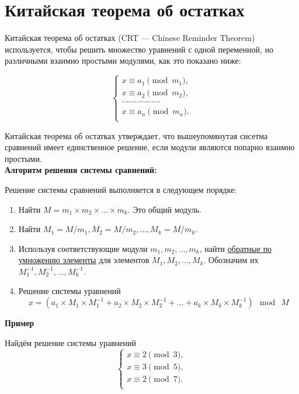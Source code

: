 \documentclass[12pt,a4paper]{scrartcl}
\begin{document}
	
\section{Китайская теорема об остатках}

Китайская теорема об остатках (CRT — Chinese Reminder Theorem) используется, чтобы решить множество уравнений с одной переменной, но различными взаимно простыми модулями, как это показано ниже:

$${\begin{cases}x\equiv a_{1}{\pmod {m_{1}}},\\x\equiv a_{2}{\pmod {m_{2}}},\\\cdots \cdots \cdots \cdots \cdots \cdots \\x\equiv a_{n}{\pmod {m_{n}}}.\\\end{cases}}$$

Китайская теорема об остатках утверждает, что вышеупомянутая сисетма сравнений имеет единственное решение, если модули являются попарно взаимно простыми. \\

\textbf{Алгоритм решения системы сравнений:}

Решение системы сравнений выполняется в следующем порядке:

\begin{enumerate}
	\item Найти $M = {m_1} \times {m_2} \times \ldots \times {m_k}$. Это общий модуль.
	
	\item Найти $M_1 = M/m_1, M_2 = M/m_2,..., M_k = M/m_k$.
	
	\item Используя соответствующие модули $m_1, m_2,..., m_k$, найти \href{https://yatb.kksctf.ru/}{обратные по умножению элементы} для элементов $M_1, M_2,..., M_k$. Обозначим их $M_1^{-1}, M_2^{-1},…, M_k^{-1}$.
	
	\item Решение системы уравнений
	$$x = (a_{1} \times M_{1} \times M_{1}^{-1} + a_{2} \times M_{2} \times M_{2}^{-1}+\dots+ a_{k} \times M_{k} \times M_{k}^{-1}) \mod\ M$$
\end{enumerate}

\textbf{Пример }

Найдём решение системы уравнений
$${\begin{cases}x\equiv 2{\pmod 3},\\x\equiv 3{\pmod 5},\\x\equiv 2{\pmod 7}.\\\end{cases}}$$
\end{document}
